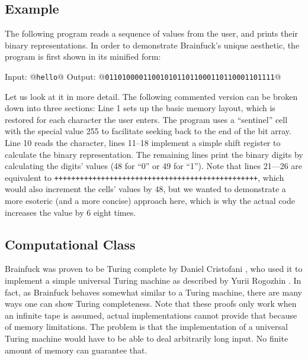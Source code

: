 \subsection{Example}

The following program reads a sequence of \ascii{} values from the user, and prints their binary representations. In order to demonstrate Brainfuck's unique aesthetic, the program is first shown in its minified form:



\begin{io}
Input: @\texttt{hello}@
Output: @\texttt{0110100001100101011011000110110001101111}@
\end{io}

Let us look at it in more detail. The following commented version can be broken down into three sections: Line 1 sets up the basic memory layout, which is restored for each character the user enters. The program uses a “sentinel” cell with the special value 255 to facilitate seeking back to the end of the bit array. Line 10 reads the character, lines 11--18 implement a simple shift register to calculate the binary representation. The remaining lines print the binary digits by calculating the digits' \ascii{} values (48 for “0” or 49 for “1”). Note that lines 21---26 are equivalent to \texttt{++++++++++++++++++++++++++++++++++++++++++++++++}, which would also increment the cells' values by 48, but we wanted to demonstrate a more esoteric (and a more concise) approach here, which is why the actual code increases the value by 6 eight times.




\subsection{Computational Class}

Brainfuck was proven to be Turing complete by Daniel Cristofani \cite{cristofani-universal}, who used it to implement a simple universal Turing machine as described by Yurii Rogozhin \cite{rogozhin1996small}. In fact, as Brainfuck behaves somewhat similar to a Turing machine, there are many ways one can show Turing completeness. Note that these proofs only work when an infinite tape is assumed, actual implementations cannot provide that because of memory limitations. The problem is that the implementation of a universal Turing machine would have to be able to deal arbitrarily long input. No finite amount of memory can guarantee that.

